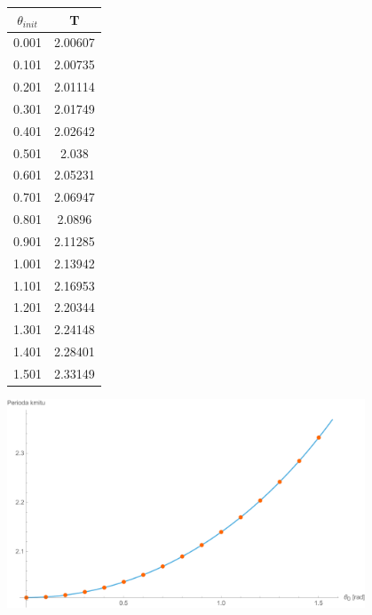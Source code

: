 \documentclass[reqno, a4paper]{amsart}
\begin{document}
\begin{minipage}{\textwidth}
\begin{minipage}[b]{0.2\textwidth}
\centering
\begin{tabular}{|c|c|}
\hline
$\theta_{init}$ & T \\ 
\hline
0.001& 2.00607\\0.101& 2.00735\\0.201& 2.01114\\0.301& 2.01749\\0.401& 2.02642\\0.501& 2.038\\0.601& 2.05231\\0.701& 2.06947\\0.801& 2.0896\\0.901& 2.11285\\1.001& 2.13942
\\1.101& 2.16953\\1.201& 2.20344\\1.301& 2.24148\\1.401& 2.28401\\1.501& 2.33149\\
\hline
\end{tabular}
\end{minipage}
\begin{minipage}[b]{0.79\textwidth}
\centering
\includegraphics[width=0.8\textwidth]{Runge - Kutta, Perioda}
\end{minipage}
\hfill
\end{minipage}
\end{document}
